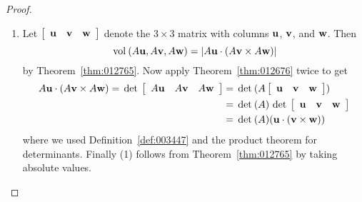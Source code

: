 \begin{proof}

\begin{enumerate}
\item  Let $\left[ \begin{array}{ccc} \textbf{u} & \textbf{v} & \textbf{w} \end{array}\right]$ denote the $3 \times 3$ matrix with columns $\textbf{u}$, $\textbf{v}$, and $\textbf{w}$. Then
\begin{equation*}
\thinspace\operatorname{vol\medspace}(A\textbf{u}, A\textbf{v}, A\textbf{w}) = |A\textbf{u} \cdot (A\textbf{v} \times A\textbf{w})|
\end{equation*}
by Theorem~\ref{thm:012765}. Now apply Theorem~\ref{thm:012676} twice to get
\begin{align*}
A\textbf{u} \cdot (A\textbf{v} \times A\textbf{w}) = \thinspace\operatorname{det\medspace}\left[ \begin{array}{ccc} A\textbf{u} & A\textbf{v} & A\textbf{w}\end{array}\right] 
&= \thinspace\operatorname{det\medspace}(A\left[ \begin{array}{ccc} \textbf{u} & \textbf{v} & \textbf{w} \end{array}\right]) \\
&= \thinspace\operatorname{det\medspace}(A)\thinspace\operatorname{det\medspace}\left[ \begin{array}{ccc} \textbf{u} & \textbf{v} & \textbf{w} \end{array}\right] \\
&= \thinspace\operatorname{det\medspace}(A)(\textbf{u} \cdot (\textbf{v} \times \textbf{w}))
\end{align*}
where we used Definition~\ref{def:003447} and the product theorem for determinants. Finally (1) follows from Theorem~\ref{thm:012765} by taking absolute values.
\end{enumerate}

\begin{wrapfigure}{l}{5cm} 
\centering

\end{wrapfigure}


\end{proof}
